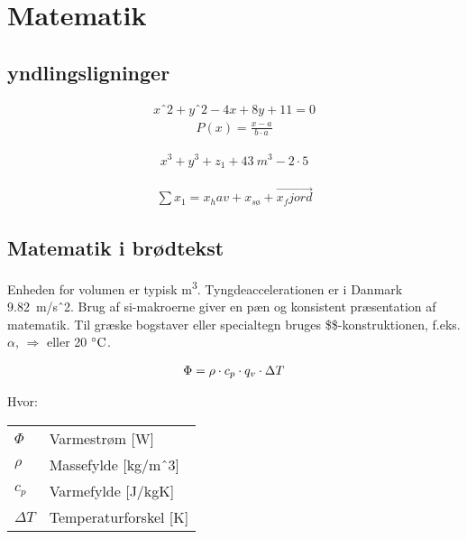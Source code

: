 \chapter{Matematik}

\label{Label 1}

\section{yndlingsligninger}

\begin{align}
xˆ2 + yˆ2 - 4x + 8y + 11 = 0
\label{eq:ligning1}
\end{align}
\begin{align}
P(x) = \frac{x - a}{b \cdot a}
\end{align}


\begin{align}
x^3 + y^3 + z_1 + \SI{43}{m^3} - 2 \cdot 5
\end{align}

\begin{align}
\sum x_1 = x_hav + x_{s\textit{ø}} + \vec{x_fjord}
\end{align}

\section{Matematik i brødtekst}

Enheden for volumen er typisk \si{m^3}. Tyngdeaccelerationen er i Danmark \SI{9,82}{m/sˆ2}. Brug
af si-makroerne giver en pæn og konsistent præsentation af matematik. Til græske bogstaver eller specialtegn
bruges \$\$-konstruktionen, f.eks. $\alpha$, $\Rightarrow$ eller 20 $^{\circ}\text{C}$.




\begin{align}
\Phi = \rho \cdot c_p \cdot q_v \cdot \Delta T
\label{eq:flux}
\end{align}

Hvor:
\begin{table}[H]
\begin{tabular}{l|l}
$\Phi$ & Varmestrøm [\si{W}] \\
$\rho$ & Massefylde [\si{kg/mˆ3}] \\
$c_p$ & Varmefylde [\si{J/kgK}] \\
$\Delta T$ & Temperaturforskel [\si{K}]
\end{tabular}
\end{table}


